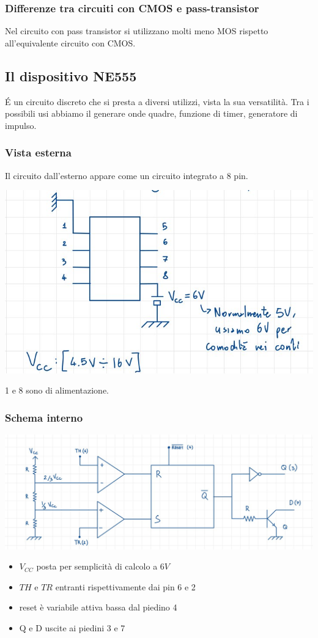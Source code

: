 \documentclass[11pt,a4paper,]{article}
\begin{document}
\subsubsection{Differenze tra circuiti con CMOS e pass-transistor}
Nel circuito con pass transistor si utilizzano molti meno MOS rispetto all'equivalente circuito con CMOS.
\subsection{Il dispositivo NE555}
É un circuito discreto che si presta a diversi utilizzi, vista la sua versatilità. Tra i possibili usi abbiamo il generare onde quadre, funzione di timer, generatore di impulso.
\subsubsection{Vista esterna}
Il circuito dall'esterno appare come un circuito integrato a 8 pin.
\begin{center}
	\includegraphics[width=0.5\linewidth]{img/ne555}
\end{center}
\begin{nota}
	1 e 8 sono di alimentazione.
\end{nota}
\subsubsection{Schema interno}
\begin{center}
	\includegraphics[width=0.5\linewidth]{"img/ne555 interno"}
\end{center}
\begin{itemize}
	\item $V_{CC}$ posta per semplicità di calcolo a $6V$
	\item $TH$ e $TR$ entranti rispettivamente dai pin 6 e 2
	\item reset è variabile attiva bassa dal piedino 4
	\item Q e D uscite ai piedini 3 e 7
\end{itemize}
\end{document}
